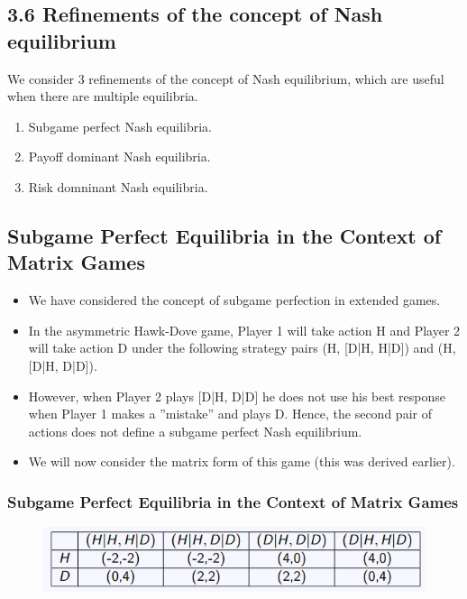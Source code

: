 \documentclass[]{report}
\begin{document}
\subsection{3.6 Refinements of the concept of Nash equilibrium}
We consider 3 refinements of the concept of Nash equilibrium,
which are useful when there are multiple equilibria.
\begin{enumerate}
	\item Subgame perfect Nash equilibria.
	\item Payoff dominant Nash equilibria.
	\item Risk domninant Nash equilibria.
\end{enumerate}

\subsection{Subgame Perfect Equilibria in the Context of Matrix Games}
\begin{itemize}
	\item We have considered the concept of subgame perfection in extended
	games.
	\item In the asymmetric Hawk-Dove game, Player 1 will take action H
	and Player 2 will take action D under the following strategy pairs
	(H, [D|H, H|D]) and (H, [D|H, D|D]).
	\item 	However, when Player 2 plays [D|H, D|D] he does not use his best
	response when Player 1 makes a ”mistake” and plays D. Hence,
	the second pair of actions does not define a subgame perfect Nash
	equilibrium.
	\item 	We will now consider the matrix form of this game (this was
	derived earlier).
\end{itemize}

\subsubsection{Subgame Perfect Equilibria in the Context of Matrix Games}

\begin{figure}[h!]
\centering
\includegraphics[width=0.7\linewidth]{images/DR6-Slide34}
\caption{}
\label{fig:DR6-Slide34}
\end{figure}
\end{document}
